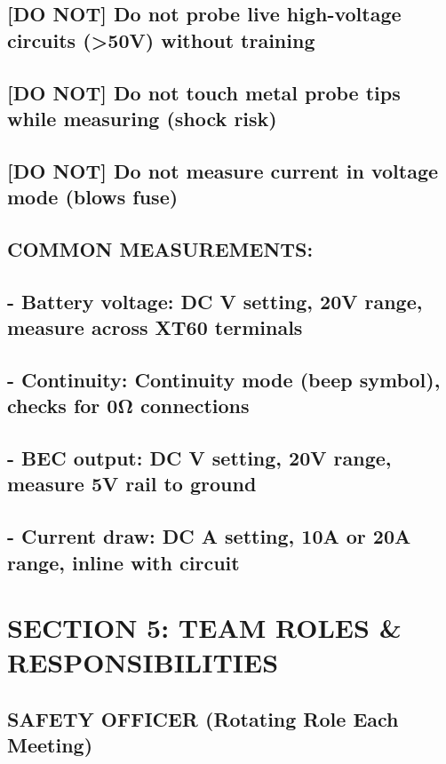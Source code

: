 \documentclass[11pt,letterpaper]{article}
\begin{document}
{{\subsection*{[DO NOT] Do not probe live high-voltage circuits (>50V) without training}

\subsection*{[DO NOT] Do not touch metal probe tips while measuring (shock risk)}

\subsection*{[DO NOT] Do not measure current in voltage mode (blows fuse)}

\subsection*{COMMON MEASUREMENTS:}

\subsection*{- Battery voltage: DC V setting, 20V range, measure across XT60 terminals}

\subsection*{- Continuity: Continuity mode (beep symbol), checks for 0Ω connections}

\subsection*{- BEC output: DC V setting, 20V range, measure 5V rail to ground}

\subsection*{- Current draw: DC A setting, 10A or 20A range, inline with circuit}

\section{SECTION 5: TEAM ROLES \& RESPONSIBILITIES}

\subsection*{SAFETY OFFICER (Rotating Role Each Meeting)}

}}
\end{document}
